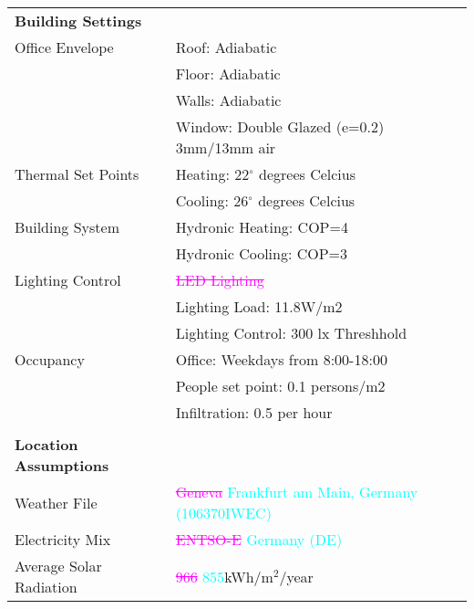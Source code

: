 \begin{description}
\begin{table}[H]
\centering
\begin{tabular}{ll}
\hline
\textbf{Building Settings}    &                                                \\
Office Envelope               & Roof: Adiabatic                                \\
                              & Floor: Adiabatic                               \\
                              & Walls: Adiabatic                               \\
                              & Window: Double Glazed (e=0.2) 3mm/13mm air \\
Thermal Set Points            & Heating: 22$^{\circ}$ degrees Celcius          \\
                              & Cooling: 26$^{\circ}$ degrees Celcius          \\
Building System               & Hydronic Heating: COP=4                        \\
                              & Hydronic Cooling: COP=3                        \\
Lighting Control              & \textcolor{magenta}{\sout{ LED Lighting }}                                  \\
                              & Lighting Load: 11.8W/m2                        \\
                              & Lighting Control: 300 lx Threshhold            \\
Occupancy                     & Office: Weekdays from 8:00-18:00               \\
                              & People set point: 0.1 persons/m2               \\
                              & Infiltration: 0.5 per hour                     \\
                              &                                                \\
\textbf{Location Assumptions} &                                                \\
Weather File                  & \textcolor{magenta}{\sout{Geneva}} \textcolor{cyan}{Frankfurt am Main, Germany (106370IWEC)}               \\
Electricity Mix               & \textcolor{magenta}{\sout{ENTSO-E}} \textcolor{cyan}{Germany (DE)} \cite{itten2012life}                   \\
Average Solar Radiation               & \textcolor{magenta}{\sout{966}} \textcolor{cyan}{855}kWh/m$^2$/year                              \\

\end{tabular}
\end{table}
\end{description}
